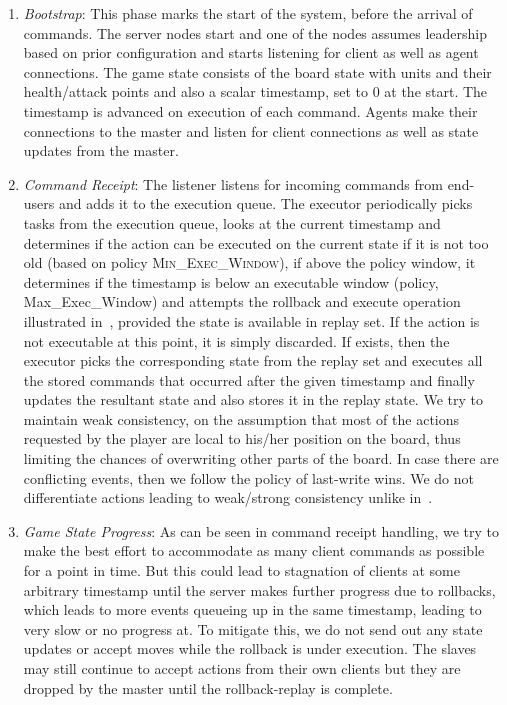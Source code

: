 \documentclass[a4paper]{IEEEtran}
\begin{document}
  \begin{enumerate}
    \item \emph{Bootstrap}: This phase marks the start of the system, before the arrival of commands. The server nodes start and one of the nodes assumes leadership based on prior configuration and starts listening for client as well as agent connections. The game state consists of the board state with units and their health/attack points and also a scalar timestamp, set to 0 at the start. The timestamp is advanced on execution of each command. Agents make their connections to the master and listen for client connections as well as state updates from the master. 
  
    \item \emph{Command Receipt}: The listener listens for incoming commands from end-users and adds it to the execution queue. The executor periodically picks tasks from the execution queue, looks at the current timestamp and determines if the action can be executed on the current state if it is not too old (based on policy \textsc{Min\_Exec\_Window}), if above the policy window, it determines if the timestamp is below an executable window (policy, Max\_Exec\_Window) and attempts the rollback and execute operation illustrated in~\cite{cronin2004efficient}, provided the state is available in replay set. If the action is not executable at this point, it is simply discarded. If exists, then the executor picks the corresponding state from the replay set and executes all the stored commands that occurred after the given timestamp and finally updates the resultant state and also stores it in the replay state. We try to maintain weak consistency, on the assumption that most of the actions requested by the player are local to his/her position on the board, thus limiting the chances of overwriting other parts of the board. In case there are conflicting events, then we follow the policy of last-write wins. We do not differentiate actions leading to weak/strong consistency unlike in~\cite{cronin2004efficient}.

    \item \emph{Game State Progress}: As can be seen in command receipt handling, we try to make the best effort to accommodate as many client commands as possible for a point in time. But this could lead to stagnation of clients at some arbitrary timestamp until the server makes further progress due to rollbacks, which leads to more events queueing up in the same timestamp, leading to very slow or no progress at. To mitigate this, we do not send out any state updates or accept moves while the rollback is under execution. The slaves may still continue to accept actions from their own clients but they are dropped by the master until the rollback-replay is complete.


\end{enumerate}
\end{document}
